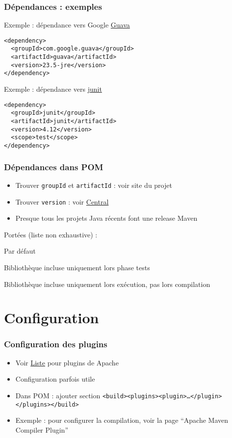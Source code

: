 \documentclass[english, french]{beamer}
\begin{document}
\begin{frame}[fragile]
	\frametitle{Dépendances : exemples}
	\begin{block}{Exemple : dépendance vers Google \href{https://github.com/google/guava/blob/master/README.md}{Guava}}
		\begin{lstlisting}[aboveskip=0pt]
<dependency>
  <groupId>com.google.guava</groupId>
  <artifactId>guava</artifactId>
  <version>23.5-jre</version>
</dependency>
\end{lstlisting}\vspace{-1mm}
	\end{block}
	\begin{block}{Exemple : dépendance vers \href{http://search.maven.org/\#search\%7Cgav\%7C1\%7Cg:"junit" AND a:"junit"}{junit}}
		\begin{lstlisting}[aboveskip=0pt]
<dependency>
  <groupId>junit</groupId>
  <artifactId>junit</artifactId>
  <version>4.12</version>
  <scope>test</scope>
</dependency>
\end{lstlisting}	\vspace{-1mm}
	\end{block}
\end{frame}

\begin{frame}
	\frametitle{Dépendances dans POM}
	\begin{itemize}
		\item Trouver \texttt{groupId} et \texttt{artifactId} : voir site du projet
		\item Trouver \texttt{version} : voir \href{https://search.maven.org}{Central}
		\item Presque tous les projets Java récents font une release Maven
	\end{itemize}
	Portées {\tiny (liste non exhaustive)} :
	\begin{description}
		\item[\texttt{compile}] Par défaut
		\item[\texttt{test}] Bibliothèque incluse uniquement lors phase tests
		\item[\texttt{runtime}] Bibliothèque incluse uniquement lors exécution, pas lors compilation
	\end{description}
\end{frame}

\section{Configuration}
\begin{frame}
	\frametitle{Configuration des plugins}
	\begin{itemize}
		\item Voir \href{https://maven.apache.org/plugins/index.html}{Liste} pour plugins de Apache
		\item Configuration parfois utile
		\item Dans POM : ajouter section \texttt{<build><plugins><plugin>…</plugin></plugins></build>}
		\item Exemple : pour configurer la compilation, voir la page “Apache Maven Compiler Plugin”
	\end{itemize}
\end{frame}
\end{document}
